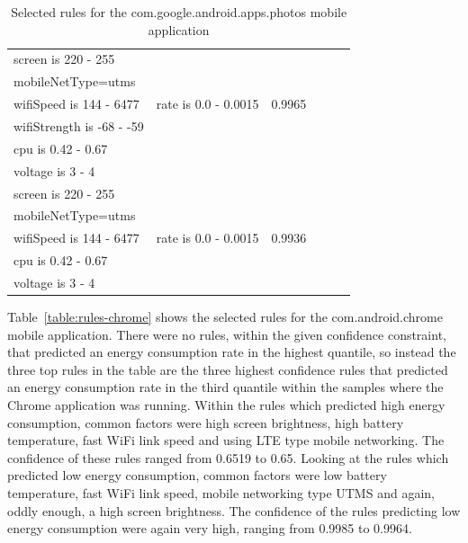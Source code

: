 \begin{table}
\begin{tabular}{|p{5.0cm}|p{3.0cm}|p{2.0cm}|p{1.5cm}|p{0.3cm}| p{0.3cm}|}
\hline
	screen is 220 - 255				& & \\
	mobileNetType=utms				& & \\
	wifiSpeed is 144 - 6477		& rate is 0.0 - 0.0015 & 0.9965 \\
	wifiStrength is -68 - -59		& & \\
	cpu is 0.42 - 0.67				& & \\
	voltage is 3 - 4				& & \\
\hline
	screen is 220 - 255				& & \\
	mobileNetType=utms				& & \\
	wifiSpeed is 144 - 6477		& rate is 0.0 - 0.0015 & 0.9936 \\
	cpu is 0.42 - 0.67				& & \\
	voltage is 3 - 4				& & \\
\hline
\end{tabular}
	\caption{Selected rules for the com.google.android.apps.photos mobile application}
	\label{table:rules-android-photos}
\end{table}

Table~\ref{table:rules-chrome} shows the selected rules for the com.android.chrome mobile application. There were no rules, within the given confidence constraint, that predicted an energy consumption rate in the highest quantile, so instead the three top rules in the table are the three highest confidence rules that predicted an energy consumption rate in the third quantile within the samples where the Chrome application was running. Within the rules which predicted high energy consumption, common factors were high screen brightness, high battery temperature, fast WiFi link speed and using LTE type mobile networking. The confidence of these rules ranged from 0.6519 to 0.65. Looking at the rules which predicted low energy consumption, common factors were low battery temperature, fast WiFi link speed, mobile networking type UTMS and again, oddly enough, a high screen brightness. The confidence of the rules predicting low energy consumption were again very high, ranging from 0.9985 to 0.9964.   

